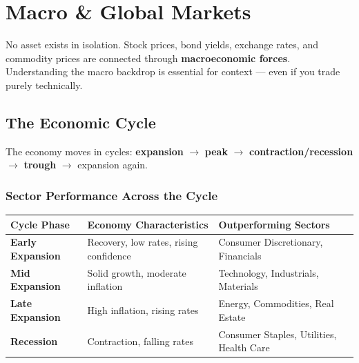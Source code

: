 
\chapter{Macro \& Global Markets}

\begin{notebox}
No asset exists in isolation. Stock prices, bond yields, exchange rates, and commodity prices
are connected through \textbf{macroeconomic forces}. Understanding the macro backdrop is essential
for context — even if you trade purely technically.
\end{notebox}

\section{The Economic Cycle}

The economy moves in cycles: \textbf{expansion} $\rightarrow$ \textbf{peak} $\rightarrow$
\textbf{contraction/recession} $\rightarrow$ \textbf{trough} $\rightarrow$ expansion again.

\subsection{Sector Performance Across the Cycle}

\begin{center}
\begin{tabular}{>{\bfseries}p{3cm} p{4cm} p{6cm}}
\toprule
Cycle Phase & Economy Characteristics & Outperforming Sectors \\
\midrule
Early Expansion & Recovery, low rates, rising confidence & Consumer Discretionary, Financials \\
Mid Expansion & Solid growth, moderate inflation & Technology, Industrials, Materials \\
Late Expansion & High inflation, rising rates & Energy, Commodities, Real Estate \\
Recession & Contraction, falling rates & Consumer Staples, Utilities, Health Care \\
\bottomrule
\end{tabular}
\end{center}

